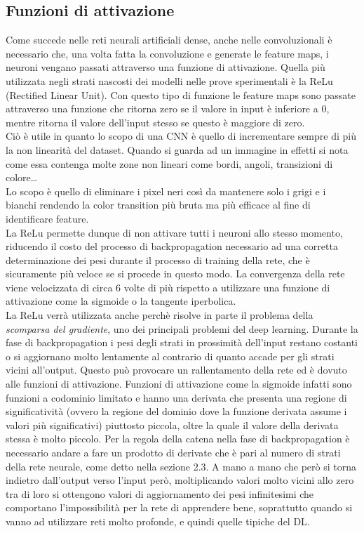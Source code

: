 \subsection{Funzioni di attivazione}
Come succede nelle reti neurali artificiali dense, anche nelle convoluzionali 
è necessario che, una volta fatta la convoluzione e generate le feature maps, i 
neuroni vengano passati attraverso una funzione di attivazione. 
Quella più utilizzata negli strati nascosti dei modelli nelle prove sperimentali è la ReLu
 (Rectified Linear Unit). Con questo tipo di funzione le feature maps sono passate attraverso una
  funzione che ritorna zero se il valore in input è inferiore a 0, mentre ritorna il valore
   dell’input stesso se questo è maggiore di zero. \\
   Ciò è utile in quanto lo scopo di una CNN è quello di incrementare sempre di più la non
    linearità del dataset. Quando si guarda ad un immagine in effetti si nota come essa
     contenga molte zone non lineari come bordi, angoli, transizioni di colore… \\
     Lo scopo è quello di eliminare i pixel neri così da mantenere solo i grigi e i bianchi 
     rendendo la color transition più bruta ma più efficace al fine di identificare feature.\\
       La ReLu permette dunque di non attivare tutti i neuroni allo stesso momento, riducendo 
       il costo del processo di backpropagation necessario ad una corretta determinazione
        dei pesi durante il processo di training della rete, che è sicuramente più veloce
         se si procede in questo modo.
La convergenza della rete viene velocizzata di circa 6 volte di più rispetto
 a utilizzare una funzione di attivazione come la sigmoide o la tangente iperbolica.\\
 La ReLu verrà utilizzata anche perchè risolve in parte il problema della \emph{scomparsa del gradiente},
  uno dei 
 principali problemi del deep learning. Durante la fase di backpropagation i pesi degli strati in
  prossimità dell’input restano costanti o si aggiornano molto lentamente al contrario di quanto 
  accade per gli strati vicini all’output. Questo può provocare un rallentamento della rete ed è dovuto 
  alle funzioni di attivazione. Funzioni di attivazione come la sigmoide infatti sono funzioni a codominio
   limitato e hanno una derivata
    che presenta una regione di significatività (ovvero la regione del dominio dove la funzione derivata assume
     i valori più significativi) piuttosto piccola, oltre la quale il valore della derivata stessa
     è molto piccolo. Per la regola della catena nella fase di backpropagation è necessario 
     andare a fare un
      prodotto di derivate che è pari al numero di strati della rete neurale, come detto nella sezione 2.3.
       A mano a mano che però si torna 
      indietro dall’output verso l’input però, moltiplicando valori molto 
      vicini allo zero tra di loro si
       ottengono valori di aggiornamento dei pesi infinitesimi che comportano l'impossibilità 
       per la rete di apprendere bene, soprattutto quando si vanno ad utilizzare reti 
       molto profonde, e quindi quelle tipiche del DL.


